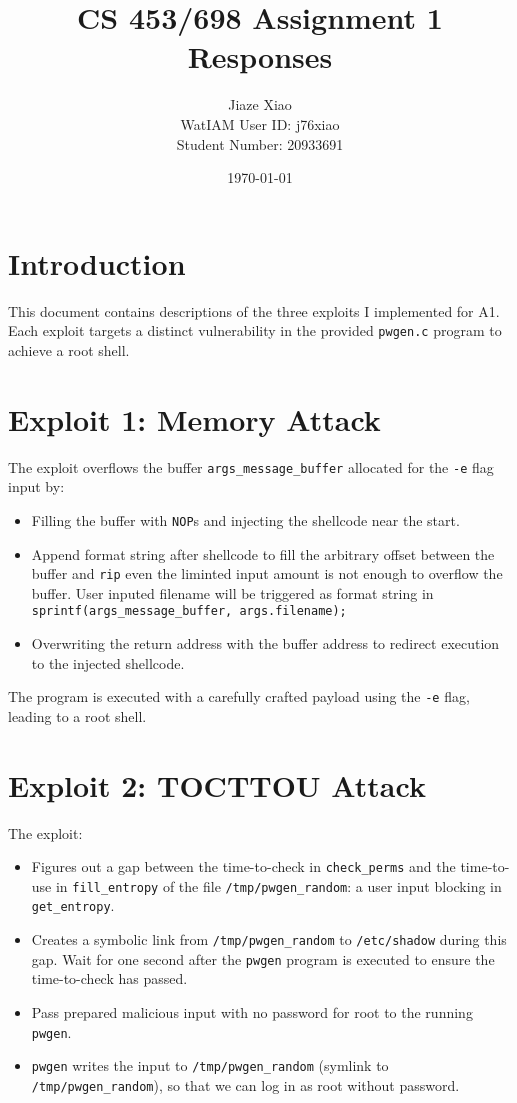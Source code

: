 \documentclass[12pt]{article}
\title{CS 453/698 Assignment 1 Responses}
\author{Jiaze Xiao \\ WatIAM User ID: j76xiao \\ Student Number: 20933691}
\date{\today}
\begin{document}
\maketitle

\section*{Introduction}
This document contains descriptions of the three exploits I implemented for A1. Each exploit targets a distinct vulnerability in the provided \texttt{pwgen.c} program to achieve a root shell.

\section*{Exploit 1: Memory Attack}
The exploit overflows the buffer \texttt{args\_message\_buffer} allocated for the \texttt{-e} flag input by:
\begin{itemize}
    \item Filling the buffer with \texttt{NOP}s and injecting the shellcode near the start.
    \item Append format string after shellcode to fill the arbitrary  offset between the buffer and \texttt{rip} even the liminted input amount is not enough to overflow the buffer. User inputed filename will be triggered as format string in \\\texttt{sprintf(args\_message\_buffer, args.filename);}
    \item Overwriting the return address with the buffer address to redirect execution to the injected shellcode.
\end{itemize}
The program is executed with a carefully crafted payload using the \texttt{-e} flag, leading to a root shell.

\section*{Exploit 2: TOCTTOU Attack}
The exploit:
\begin{itemize}
    \item Figures out a gap between the time-to-check in \texttt{check\_perms} and the time-to-use in \texttt{fill\_entropy} of the file \texttt{/tmp/pwgen\_random}: a user input blocking in \texttt{get\_entropy}.
    \item Creates a symbolic link from \texttt{/tmp/pwgen\_random} to \texttt{/etc/shadow} during this gap. Wait for one second after the \texttt{pwgen} program is executed to ensure the time-to-check has passed.
    \item Pass prepared malicious input with no password for root to the running \texttt{pwgen}.
    \item \texttt{pwgen} writes the input to \texttt{/tmp/pwgen\_random} (symlink to \texttt{/tmp/pwgen\_random}), so that we can log in as root without password.
\end{itemize}
\end{document}
